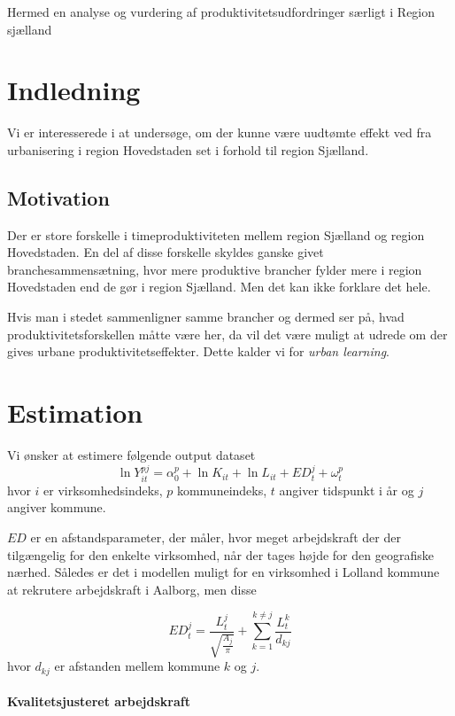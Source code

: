 

Hermed en analyse og vurdering af produktivitetsudfordringer særligt i Region sjælland

\section{Indledning}
Vi er interesserede i at undersøge, om der kunne være uudtømte effekt ved fra urbanisering i region Hovedstaden set i forhold til region Sjælland. 
\subsection{Motivation}
Der er store forskelle i timeproduktiviteten mellem region Sjælland og region Hovedstaden. En del af disse forskelle skyldes ganske givet branchesammensætning, hvor mere produktive brancher fylder mere i region Hovedstaden end de gør i region Sjælland. Men det kan ikke forklare det hele.

Hvis man i stedet sammenligner samme brancher og dermed ser på, hvad produktivitetsforskellen måtte være her, da vil det være muligt at udrede om der gives urbane produktivitetseffekter. Dette kalder vi for \emph{urban learning}.

\section{Estimation}
Vi ønsker at estimere følgende output dataset
\begin{equation}
	\ln Y_{it}^{pj} = \alpha^p_0 + \ln K_{it} + \ln L_{it} + ED^j_{t} + \omega^p_{t}
\end{equation}
hvor $i$ er virksomhedsindeks, $p$ kommuneindeks, $t$ angiver tidspunkt i år og $j$ angiver kommune. 


$ED$ er en afstandsparameter, der måler, hvor meget arbejdskraft der der tilgængelig for den enkelte virksomhed, når der tages højde for den geografiske nærhed. Således er det i modellen muligt for en virksomhed i Lolland kommune at rekrutere arbejdskraft i Aalborg, men disse 

\begin{equation}
 	ED^j_t = \frac{L^j_t}{\sqrt{\frac{A_j}{\pi}}} + \sum_{k=1}^{k \neq j} \frac{L^k_t}{d_{kj}}
 \end{equation} 
 hvor $d_{kj}$ er afstanden mellem kommune $k$ og $j$. 

\paragraph{Kvalitetsjusteret arbejdskraft}




